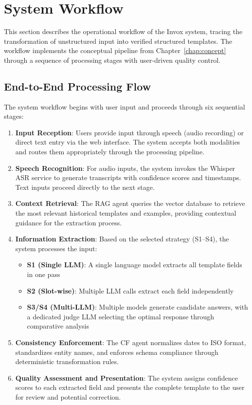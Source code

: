 \section{System Workflow}
\label{sec:system-workflow}

This section describes the operational workflow of the Invox system, tracing the transformation of unstructured input into verified structured templates. The workflow implements the conceptual pipeline from Chapter~\ref{chap:concept} through a sequence of processing stages with user-driven quality control.

\subsection*{End-to-End Processing Flow}

The system workflow begins with user input and proceeds through six sequential stages:

\begin{enumerate}
    \item \textbf{Input Reception}: Users provide input through speech (audio recording) or direct text entry via the web interface. The system accepts both modalities and routes them appropriately through the processing pipeline.
    
    \item \textbf{Speech Recognition}: For audio inputs, the system invokes the Whisper ASR service to generate transcripts with confidence scores and timestamps. Text inputs proceed directly to the next stage.
    
    \item \textbf{Context Retrieval}: The RAG agent queries the vector database to retrieve the most relevant historical templates and examples, providing contextual guidance for the extraction process.
    
    \item \textbf{Information Extraction}: Based on the selected strategy (S1–S4), the system processes the input:
    \begin{itemize}
        \item \textbf{S1 (Single LLM)}: A single language model extracts all template fields in one pass
        \item \textbf{S2 (Slot-wise)}: Multiple LLM calls extract each field independently  
        \item \textbf{S3/S4 (Multi-LLM)}: Multiple models generate candidate answers, with a dedicated judge LLM selecting the optimal response through comparative analysis
    \end{itemize}
    
    \item \textbf{Consistency Enforcement}: The CF agent normalizes dates to ISO format, standardizes entity names, and enforces schema compliance through deterministic transformation rules.
    
    \item \textbf{Quality Assessment and Presentation}: The system assigns confidence scores to each extracted field and presents the complete template to the user for review and potential correction.
\end{enumerate}

